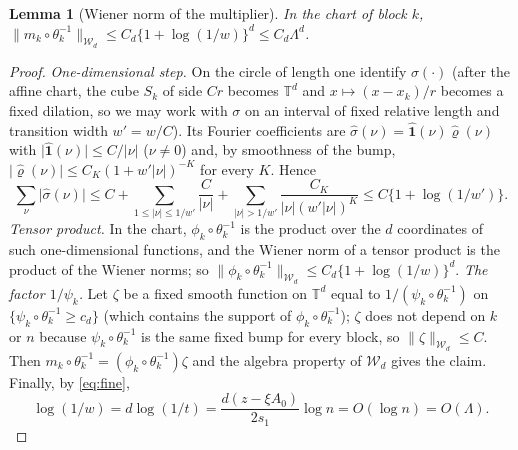 \documentclass[11pt]{article}
\newtheorem{lemma}[lemma]{Lemma}
\newcommand{\Torus}{\mathbb{T}}
\newcommand{\cW}{\mathcal{W}}
\newcommand{\norm}[1]{\lVert #1\rVert}
\newcommand{\abs}[1]{\lvert #1\rvert}
\newcommand{\one}{\mathbf{1}}
\begin{document}
\begin{lemma}[Wiener norm of the multiplier]\label{C:lem:multiplier}
In the chart of block \(k\), \(\norm{m_k\circ\theta_k^{-1}}_{\cW_d}\le C_d\{1+\log(1/w)\}^d\le C_d\Lambda^d\).
\end{lemma}
\begin{proof}
\emph{One-dimensional step.}  On the circle of length one identify
\(\sigma(\cdot)\) (after the affine chart, the cube \(S_k\) of side \(Cr\)
becomes \(\Torus^d\) and \(x\mapsto(x-x_k)/r\) becomes a fixed dilation, so
we may work with \(\sigma\) on an interval of fixed relative length and
transition width \(w'=w/C\)).  Its Fourier coefficients are
\(\widehat\sigma(\nu)=\widehat{\one}(\nu)\widehat{\varrho}(\nu)\) with
\(\abs{\widehat{\one}(\nu)}\le C/\abs\nu\) (\(\nu\ne0\)) and, by smoothness of
the bump, \(\abs{\widehat\varrho(\nu)}\le C_K(1+w'\abs\nu)^{-K}\) for every
\(K\).  Hence
\[
 \sum_\nu\abs{\widehat\sigma(\nu)}\le C+\sum_{1\le\abs\nu\le1/w'}\frac C{\abs\nu}
 +\sum_{\abs\nu>1/w'}\frac{C_K}{\abs\nu(w'\abs\nu)^K}\le C\{1+\log(1/w')\}.
\]
\emph{Tensor product.}  In the chart, \(\phi_k\circ\theta_k^{-1}\) is the
product over the \(d\) coordinates of such one-dimensional functions, and
the Wiener norm of a tensor product is the product of the Wiener norms;
so \(\norm{\phi_k\circ\theta_k^{-1}}_{\cW_d}\le C_d\{1+\log(1/w)\}^d\).
\emph{The factor \(1/\psi_k\).}  Let \(\zeta\) be a fixed smooth function
on \(\Torus^d\) equal to \(1/(\psi_k\circ\theta_k^{-1})\) on
\(\{\psi_k\circ\theta_k^{-1}\ge c_d\}\) (which contains the support of
\(\phi_k\circ\theta_k^{-1}\)); \(\zeta\) does not depend on \(k\) or \(n\)
because \(\psi_k\circ\theta_k^{-1}\) is the same fixed bump for every block,
so \(\norm\zeta_{\cW_d}\le C\).  Then \(m_k\circ\theta_k^{-1}=(\phi_k\circ\theta_k^{-1})\zeta\)
and the algebra property of \(\cW_d\) gives the claim.  Finally, by
\eqref{eq:fine},
\[
 \log(1/w)=d\log(1/t)=\frac{d(z-\xi A_0)}{2s_1}\log n=O(\log n)=O(\Lambda).
\]
\end{proof}
\end{document}

